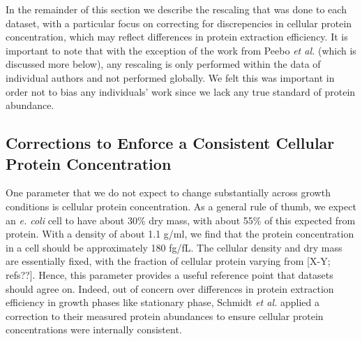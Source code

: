\documentclass[11pt, letterpaper]{article}
\begin{document}
In the remainder of this section we describe the rescaling that was done to each
dataset, with a particular focus on correcting for discrepencies in cellular
protein concentration, which may reflect differences in protein extraction
efficiency. It is important to note that with the exception of the work from
Peebo {\it et al.} (which is discussed more below), any rescaling is only
performed within the data of individual authors and not performed globally. We
felt this was important in order not to bias any individuals' work since we lack
any true standard of protein abundance.



\subsection{Corrections to Enforce a Consistent Cellular Protein Concentration}


One parameter that we do not expect to change substantially across growth
conditions is cellular protein concentration. As a general rule of thumb, we
expect an {\it e. coli} cell to have about 30\% dry mass, with about 55\% of
this expected from protein. With a density of about 1.1 g/ml, we find that the
protein concentration in a cell should be approximately 180 fg/fL.  The cellular
density and dry mass are essentially fixed, with the fraction of cellular
protein varying from [X-Y; refs??]. Hence,  this parameter provides a useful
reference point that datasets should agree on.  Indeed, out of concern over
differences in protein extraction efficiency in growth phases like stationary
phase, Schmidt {\it et al.} applied a correction to their measured protein
abundances to ensure cellular protein concentrations were internally consistent.
\end{document}
